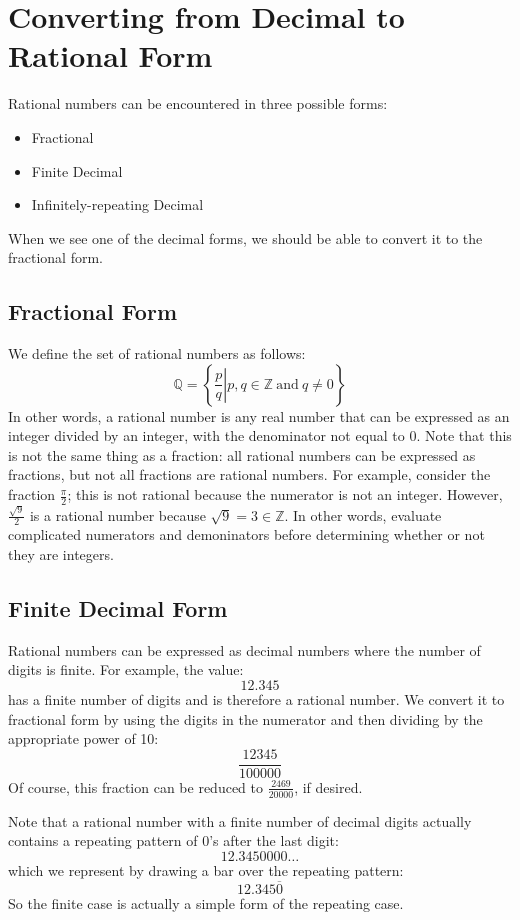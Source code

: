 \documentclass[letterpaper,12pt,fleqn]{article}
\begin{document}
\section*{Converting from Decimal to Rational Form}

Rational numbers can be encountered in three possible forms:
\begin{itemize}
\item Fractional
\item Finite Decimal
\item Infinitely-repeating Decimal
\end{itemize}
When we see one of the decimal forms, we should be able to convert it to the
fractional form.

\subsection*{Fractional Form}

We define the set of rational numbers as follows:
\[\mathbb{Q}=\left\{\left.\frac{p}{q}\right|
    p,q\in\mathbb{Z}\ \mbox{and}\ q\ne0\right\}\]
In other words, a rational number is any real number that can be expressed as
an integer divided by an integer, with the denominator not equal to 0. Note
that this is not the same thing as a fraction: all rational numbers can be
expressed as fractions, but not all fractions are rational numbers. For
example, consider the fraction $\frac{\pi}{2}$; this is not rational because
the numerator is not an integer. However, $\frac{\sqrt{9}}{2}$ is a rational
number because $\sqrt{9}=3\in\mathbb{Z}$. In other words, evaluate complicated
numerators and demoninators before determining whether or not they are
integers.

\subsection*{Finite Decimal Form}

Rational numbers can be expressed as decimal numbers where the number of digits
is finite. For example, the value:
\[12.345\]
has a finite number of digits and is therefore a rational number. We convert it
to fractional form by using the digits in the numerator and then dividing by
the appropriate power of 10:
\[\frac{12345}{100000}\]
Of course, this fraction can be reduced to $\frac{2469}{20000}$, if desired.

Note that a rational number with a finite number of decimal digits actually
contains a repeating pattern of 0's after the last digit:
\[12.3450000\ldots\]
which we represent by drawing a bar over the repeating pattern:
\[12.345\overline{0}\]
So the finite case is actually a simple form of the repeating case.
\end{document}
